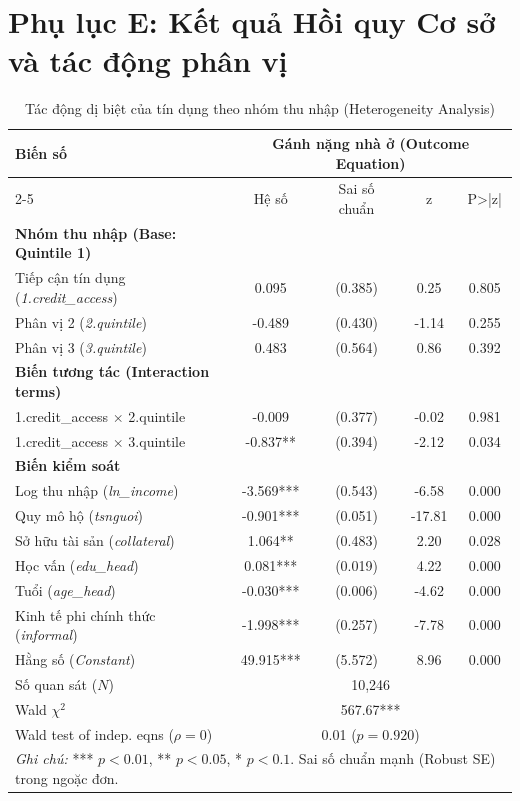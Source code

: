 \documentclass[12pt,a4paper]{report}
\begin{document}
\newpage	
\section*{Phụ lục E: Kết quả Hồi quy Cơ sở và tác động phân vị}

\begin{table}[htbp]
	\centering
	\caption{Tác động dị biệt của tín dụng theo nhóm thu nhập (Heterogeneity Analysis)}
	\label{tab:heterogeneity}
	\small
	\begin{tabular}{lcccc}
		\toprule
		\multirow{2}{*}{\textbf{Biến số}} & \multicolumn{4}{c}{\textbf{Gánh nặng nhà ở (Outcome Equation)}} \\
		\cmidrule{2-5}
		& Hệ số & Sai số chuẩn & z & P>|z| \\
		\midrule
		\textbf{Nhóm thu nhập (Base: Quintile 1)} & & & & \\
		Tiếp cận tín dụng (\textit{1.credit\_access}) & 0.095 & (0.385) & 0.25 & 0.805 \\
		Phân vị 2 (\textit{2.quintile}) & -0.489 & (0.430) & -1.14 & 0.255 \\
		Phân vị 3 (\textit{3.quintile}) & 0.483 & (0.564) & 0.86 & 0.392 \\
		\midrule
		\textbf{Biến tương tác (Interaction terms)} & & & & \\
		1.credit\_access $\times$ 2.quintile & -0.009 & (0.377) & -0.02 & 0.981 \\
		1.credit\_access $\times$ 3.quintile & -0.837** & (0.394) & -2.12 & 0.034 \\
		\midrule
		\textbf{Biến kiểm soát} & & & & \\
		Log thu nhập (\textit{ln\_income}) & -3.569*** & (0.543) & -6.58 & 0.000 \\
		Quy mô hộ (\textit{tsnguoi}) & -0.901*** & (0.051) & -17.81 & 0.000 \\
		Sở hữu tài sản (\textit{collateral}) & 1.064** & (0.483) & 2.20 & 0.028 \\
		Học vấn (\textit{edu\_head}) & 0.081*** & (0.019) & 4.22 & 0.000 \\
		Tuổi (\textit{age\_head}) & -0.030*** & (0.006) & -4.62 & 0.000 \\
		Kinh tế phi chính thức (\textit{informal}) & -1.998*** & (0.257) & -7.78 & 0.000 \\
		Hằng số (\textit{Constant}) & 49.915*** & (5.572) & 8.96 & 0.000 \\
		\midrule
		Số quan sát ($N$) & \multicolumn{4}{c}{10,246} \\
		Wald $\chi^2$ & \multicolumn{4}{c}{567.67***} \\
		Wald test of indep. eqns ($\rho=0$) & \multicolumn{4}{c}{0.01 ($p=0.920$)} \\
		\bottomrule
		\multicolumn{5}{l}{\footnotesize \textit{Ghi chú:} *** $p<0.01$, ** $p<0.05$, * $p<0.1$. Sai số chuẩn mạnh (Robust SE) trong ngoặc đơn.}
	\end{tabular}
\end{table}
\end{document}
